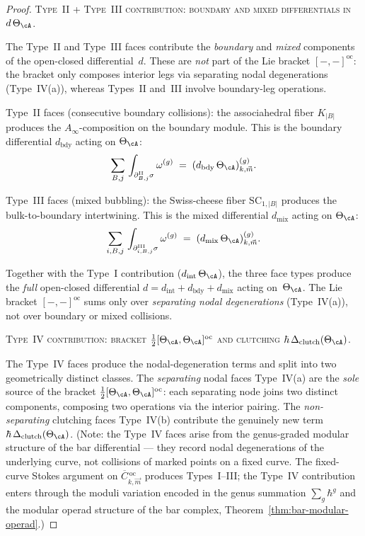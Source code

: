 \begin{proof}
\medskip
\noindent\textsc{Type~II + Type~III contribution:
boundary and mixed differentials in $d\,\Theta_\cA$.}

The Type~II and Type~III faces contribute the
\emph{boundary} and \emph{mixed} components of the
open-closed differential~$d$.  These are \emph{not} part of
the Lie bracket $[-,-]^{\mathrm{oc}}$: the bracket only
composes interior legs via separating nodal degenerations
(Type~IV(a)), whereas Types~II and~III involve
boundary-leg operations.

Type~II faces (consecutive boundary collisions): the
associahedral fiber $K_{|B|}$ produces the
$A_\infty$-composition on the boundary module.  This is the
boundary differential $d_{\mathrm{bdy}}$ acting on
$\Theta_\cA$:
\[
\sum_{B,j}\,
\int_{\partial_{B,j}^{\mathrm{II}}\sigma}
\omega^{(g)}
\;=\;
(d_{\mathrm{bdy}}\,\Theta_\cA)^{(g)}_{k, \vec{m}}.
\]

Type~III faces (mixed bubbling): the Swiss-cheese fiber
$\mathrm{SC}_{1, |B|}$ produces the bulk-to-boundary
intertwining.  This is the mixed differential
$d_{\mathrm{mix}}$ acting on $\Theta_\cA$:
\[
\sum_{i,B,j}\,
\int_{\partial_{i,B,j}^{\mathrm{III}}\sigma}
\omega^{(g)}
\;=\;
(d_{\mathrm{mix}}\,\Theta_\cA)^{(g)}_{k, \vec{m}}.
\]

Together with the Type~I contribution
($d_{\mathrm{int}}\,\Theta_\cA$), the three face types
produce the \emph{full} open-closed differential
$d = d_{\mathrm{int}} + d_{\mathrm{bdy}} + d_{\mathrm{mix}}$
acting on~$\Theta_\cA$.  The Lie bracket
$[-,-]^{\mathrm{oc}}$ sums only over \emph{separating nodal
degenerations} (Type~IV(a)), not over boundary or mixed
collisions.

\medskip
\noindent\textsc{Type~IV contribution:
bracket $\tfrac{1}{2}[\Theta_\cA, \Theta_\cA]^{\mathrm{oc}}$
and clutching $\hbar\,\Delta_{\mathrm{clutch}}(\Theta_\cA)$.}

The Type~IV faces produce the nodal-degeneration terms and
split into two geometrically distinct classes.
The \emph{separating} nodal faces Type~IV(a) are the
\emph{sole} source of the bracket
$\frac{1}{2}[\Theta_\cA, \Theta_\cA]^{\mathrm{oc}}$:
each separating node joins two distinct components, composing
two operations via the interior pairing.
The \emph{non-separating} clutching faces Type~IV(b)
contribute the genuinely new term
$\hbar\,\Delta_{\mathrm{clutch}}(\Theta_\cA)$.
(Note: the Type~IV faces arise from the genus-graded modular
structure of the bar differential --- they record nodal
degenerations of the underlying curve, not collisions of marked
points on a fixed curve.  The fixed-curve Stokes argument on
$\overline{C}{}^{\,\mathrm{oc}}_{k,\vec{m}}$ produces
Types~I--III; the Type~IV contribution enters through the
moduli variation encoded in the genus summation
$\sum_g \hbar^g$ and the modular operad structure of the bar
complex, Theorem~\textup{\ref{thm:bar-modular-operad}}.)


\end{proof}
